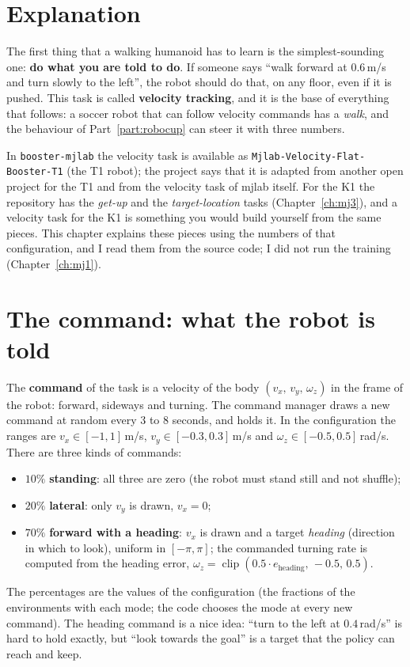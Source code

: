 \label{ch:mj2}

\section*{Explanation}
The first thing that a walking humanoid has to learn is the simplest-sounding one: \textbf{do what you are told to do}. If someone says ``walk forward at $0.6$\,m/s and turn slowly to the left'', the robot should do that, on any floor, even if it is pushed. This task is called \textbf{velocity tracking}, and it is the base of everything that follows: a soccer robot that can follow velocity commands has a \emph{walk}, and the behaviour of Part~\ref{part:robocup} can steer it with three numbers.

In \texttt{booster-mjlab} the velocity task is available as \verb!Mjlab-Velocity-Flat-Booster-T1! (the T1 robot); the project says that it is adapted from another open project for the T1 and from the velocity task of mjlab itself. For the K1 the repository has the \emph{get-up} and the \emph{target-location} tasks (Chapter~\ref{ch:mj3}), and a velocity task for the K1 is something you would build yourself from the same pieces. This chapter explains these pieces using the numbers of that configuration, and I read them from the source code; I did not run the training (Chapter~\ref{ch:mj1}).

\section*{The command: what the robot is told}
The \textbf{command} of the task is a velocity of the body $(v_x,\,v_y,\,\omega_z)$ in the frame of the robot: forward, sideways and turning. The command manager draws a new command at random every $3$ to $8$ seconds, and holds it. In the configuration the ranges are $v_x\in[-1,1]$\,m/s, $v_y\in[-0.3,0.3]$\,m/s and $\omega_z\in[-0.5,0.5]$\,rad/s. There are three kinds of commands:
\begin{itemize}[nosep]
 \item $10\%$ \textbf{standing}: all three are zero (the robot must stand still and not shuffle);
 \item $20\%$ \textbf{lateral}: only $v_y$ is drawn, $v_x=0$;
 \item $70\%$ \textbf{forward with a heading}: $v_x$ is drawn and a target \emph{heading} (direction in which to look), uniform in $[-\pi,\pi]$; the commanded turning rate is computed from the heading error, $\omega_z=\operatorname{clip}(0.5\cdot e_{\text{heading}},\,-0.5,\,0.5)$.
\end{itemize}
The percentages are the values of the configuration (the fractions of the environments with each mode; the code chooses the mode at every new command). The heading command is a nice idea: ``turn to the left at $0.4$\,rad/s'' is hard to hold exactly, but ``look towards the goal'' is a target that the policy can reach and keep.

